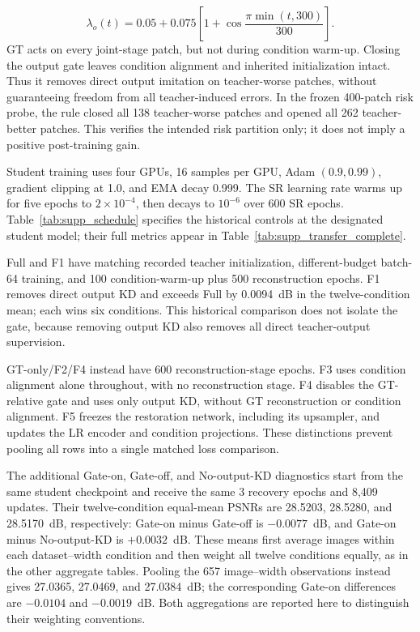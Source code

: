 \documentclass[10pt,journal,letterpaper]{IEEEtran}
\begin{document}
\begin{equation}
\lambda_o(t)=0.05+0.075\left[1+\cos\frac{\pi\min(t,300)}{300}\right].
\label{eq:supp_lambda}
\end{equation}
GT acts on every joint-stage patch, but not during condition warm-up. Closing the output gate leaves condition alignment and inherited initialization intact. Thus it removes direct output imitation on teacher-worse patches, without guaranteeing freedom from all teacher-induced errors. In the frozen 400-patch risk probe, the rule closed all 138 teacher-worse patches and opened all 262 teacher-better patches. This verifies the intended risk partition only; it does not imply a positive post-training gain.

Student training uses four GPUs, 16 samples per GPU, Adam $(0.9,0.99)$, gradient clipping at 1.0, and EMA decay 0.999. The SR learning rate warms up for five epochs to $2\times10^{-4}$, then decays to $10^{-6}$ over 600 SR epochs. Table~\ref{tab:supp_schedule} specifies the historical controls at the designated student model; their full metrics appear in Table~\ref{tab:supp_transfer_complete}.

Full and F1 have matching recorded teacher initialization, different-budget batch-64 training, and 100 condition-warm-up plus 500 reconstruction epochs. F1 removes direct output KD and exceeds Full by 0.0094~dB in the twelve-condition mean; each wins six conditions. This historical comparison does not isolate the gate, because removing output KD also removes all direct teacher-output supervision.

GT-only/F2/F4 instead have 600 reconstruction-stage epochs. F3 uses condition alignment alone throughout, with no reconstruction stage. F4 disables the GT-relative gate and uses only output KD, without GT reconstruction or condition alignment. F5 freezes the restoration network, including its upsampler, and updates the LR encoder and condition projections. These distinctions prevent pooling all rows into a single matched loss comparison.

The additional Gate-on, Gate-off, and No-output-KD diagnostics start from the same student checkpoint and receive the same 3 recovery epochs and 8,409 updates. Their twelve-condition equal-mean PSNRs are 28.5203, 28.5280, and 28.5170~dB, respectively: Gate-on minus Gate-off is $-0.0077$~dB, and Gate-on minus No-output-KD is $+0.0032$~dB. These means first average images within each dataset--width condition and then weight all twelve conditions equally, as in the other aggregate tables. Pooling the 657 image--width observations instead gives 27.0365, 27.0469, and 27.0384~dB; the corresponding Gate-on differences are $-0.0104$ and $-0.0019$~dB. Both aggregations are reported here to distinguish their weighting conventions.
\end{document}

